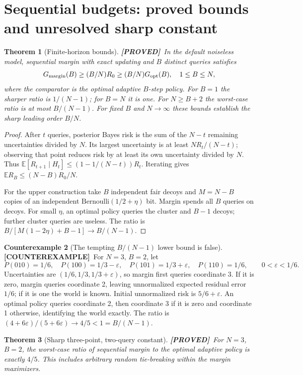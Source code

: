 \documentclass[11pt]{article}
\newtheorem{theorem}{Theorem}[section]
\theoremstyle{definition}
\newtheorem{example}[theorem]{Counterexample}
\newcommand{\E}{\mathbb E}
\newcommand{\1}{\mathbf 1}
\newcommand{\pr}{\textbf{[PROVED]}}
\newcommand{\ce}{\textbf{[COUNTEREXAMPLE]}}
\begin{document}
\section{Sequential budgets: proved bounds and unresolved sharp constant}
\begin{theorem}[Finite-horizon bounds]\label{th:budget}
\pr\ In the default noiseless model, sequential margin with exact updating
and $B$ distinct queries satisfies
\[
 G_{\rm margin}(B)\ge (B/N)R_0
 \ge (B/N)G_{\rm opt}(B),\quad 1\le B\le N,
\]
where the comparator is the optimal adaptive $B$-step policy.
For $B=1$ the sharper ratio is $1/(N-1)$; for $B=N$ it is one.
For $N\ge B+2$ the worst-case ratio is at most $B/(N-1)$.
For fixed $B$ and $N\to\infty$ these bounds establish the sharp leading
order $B/N$.
\end{theorem}
\begin{proof}
After $t$ queries, posterior Bayes risk is the sum of the $N-t$ remaining
uncertainties divided by $N$. Its largest uncertainty is at least
$NR_t/(N-t)$; observing that point reduces risk by at least its own
uncertainty divided by $N$. Thus
$\E[R_{t+1}\mid H_t]\le(1-1/(N-t))R_t$.
Iterating gives $\E R_B\le(N-B)R_0/N$.

For the upper construction take $B$ independent fair decoys and
$M=N-B$ copies of an independent $\mathrm{Bernoulli}(1/2+\eta)$ bit.
Margin spends all $B$ queries on decoys. For small $\eta$, an optimal policy
queries the cluster and $B-1$ decoys; further cluster queries are useless.
The ratio is
$B/[M(1-2\eta)+B-1]\to B/(N-1)$.
\end{proof}
\begin{example}[The tempting $B/(N-1)$ lower bound is false]\label{ex:budget}
\ce\ For $N=3$, $B=2$, let
\[
 P(010)=1/6,\quad P(100)=1/3-\varepsilon,\quad
 P(101)=1/3+\varepsilon,\quad P(110)=1/6,
 \qquad 0<\varepsilon<1/6.
\]
Uncertainties are $(1/6,1/3,1/3+\varepsilon)$, so margin first queries
coordinate 3. If it is zero, margin queries coordinate 2, leaving
unnormalized expected residual error $1/6$; if it is one the world is known.
Initial unnormalized risk is $5/6+\varepsilon$.
An optimal policy queries coordinate 2, then coordinate 3 if it is zero
and coordinate 1 otherwise, identifying the world exactly.
The ratio is $(4+6\varepsilon)/(5+6\varepsilon)\to4/5<1=B/(N-1)$.
\end{example}
\begin{theorem}[Sharp three-point, two-query constant]\label{th:n3b2}
\pr\ For $N=3$, $B=2$, the worst-case ratio of sequential margin to the
optimal adaptive policy is exactly $4/5$. This includes arbitrary random
tie-breaking within the margin maximizers.
\end{theorem}
\end{document}
